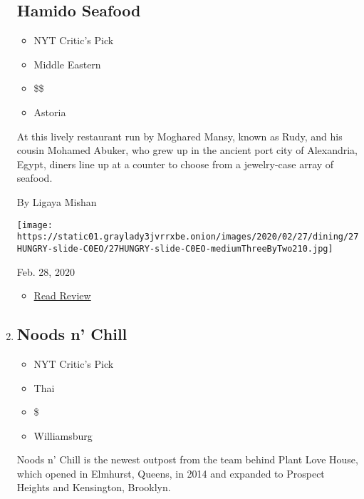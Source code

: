 \begin{enumerate}
  \hypertarget{hamido-seafood}{%
  \subsection{Hamido Seafood}\label{hamido-seafood}}

  \begin{itemize}
  \tightlist
  \item
    NYT Critic's Pick
  \item
    Middle Eastern
  \item
    \$\$
  \item
    Astoria
  \end{itemize}

  At this lively restaurant run by Moghared Mansy, known as Rudy, and
  his cousin Mohamed Abuker, who grew up in the ancient port city of
  Alexandria, Egypt, diners line up at a counter to choose from a
  jewelry-case array of seafood.

  By Ligaya Mishan

  \texttt{[image: https://static01.graylady3jvrrxbe.onion/images/2020/02/27/dining/27HUNGRY-slide-C0EO/27HUNGRY-slide-C0EO-mediumThreeByTwo210.jpg]}

  Feb. 28, 2020

  \begin{itemize}
  \tightlist
  \item
    \href{https://www.nytimes3xbfgragh.onion/2020/02/28/dining/hamido-seafood-astoria.html?rref=collection\%2Fcollection\%2Frestaurant-guide}{Read
    Review}
  \end{itemize}
\item
  \href{https://www.nytimes3xbfgragh.onion/2020/02/20/dining/noods-n-chill-review-thai.html}{}

  \hypertarget{noods-n-chill}{%
  \subsection{Noods n' Chill}\label{noods-n-chill}}

  \begin{itemize}
  \tightlist
  \item
    NYT Critic's Pick
  \item
    Thai
  \item
    \$
  \item
    Williamsburg
  \end{itemize}

  Noods n' Chill is the newest outpost from the team behind Plant Love
  House, which opened in Elmhurst, Queens, in 2014 and expanded to
  Prospect Heights and Kensington, Brooklyn.


\end{enumerate}
